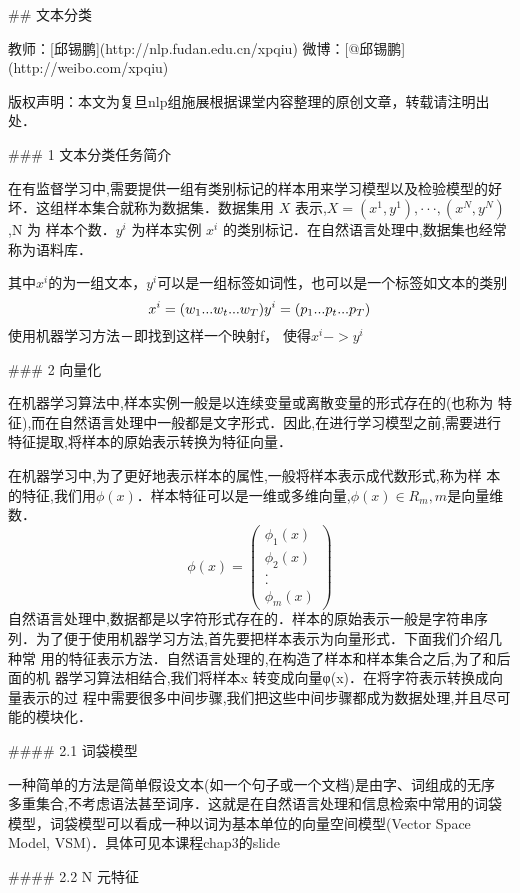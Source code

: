 ## 文本分类

教师：[邱锡鹏](http://nlp.fudan.edu.cn/xpqiu)  微博：[@邱锡鹏](http://weibo.com/xpqiu)

版权声明：本文为复旦nlp组施展根据课堂内容整理的原创文章，转载请注明出处．



### 1 文本分类任务简介

​	在有监督学习中,需要提供一组有类别标记的样本用来学习模型以及检验模型的好 坏．这组样本集合就称为数据集．数据集用 $X$ 表示,$X = {(x^1 , y^1 ), · · · , (x^N , y^N )}$,N 为 样本个数．$y^i$ 为样本实例 $x^i$ 的类别标记．在自然语言处理中,数据集也经常称为语料库．

其中$x^i$的为一组文本，$y^i$可以是一组标签如词性，也可以是一个标签如文本的类别
$$
x^i = (w_1...w_t...w_T)\\ 
y^i=(p_1...p_t...p_T)
$$
使用机器学习方法－即找到这样一个映射f， 使得$x^{i}->y^{i}$	

### 2 向量化

​	在机器学习算法中,样本实例一般是以连续变量或离散变量的形式存在的(也称为 特征),而在自然语言处理中一般都是文字形式．因此,在进行学习模型之前,需要进行 特征提取,将样本的原始表示转换为特征向量．

​	在机器学习中,为了更好地表示样本的属性,一般将样本表示成代数形式,称为样 本的特征,我们用$\phi(x)$．样本特征可以是一维或多维向量,$\phi(x) ∈ R_m,m$是向量维数．
$$
\phi(x) = \left(
		\begin{array} {ccc} \phi_1(x) \\ \phi_2 (x) \\ .\\ .\\ \phi_m(x)
		\end{array}
	      \right)
$$
​	自然语言处理中,数据都是以字符形式存在的．样本的原始表示一般是字符串序 列．为了便于使用机器学习方法,首先要把样本表示为向量形式．下面我们介绍几种常 用的特征表示方法．自然语言处理的,在构造了样本和样本集合之后,为了和后面的机 器学习算法相结合,我们将样本x 转变成向量φ(x)．在将字符表示转换成向量表示的过 程中需要很多中间步骤,我们把这些中间步骤都成为数据处理,并且尽可能的模块化．

#### 2.1 词袋模型

​	一种简单的方法是简单假设文本(如一个句子或一个文档)是由字、词组成的无序 多重集合,不考虑语法甚至词序．这就是在自然语言处理和信息检索中常用的词袋模型，词袋模型可以看成一种以词为基本单位的向量空间模型(Vector Space Model, VSM)．具体可见本课程chap3的slide

#### 2.2 N 元特征

